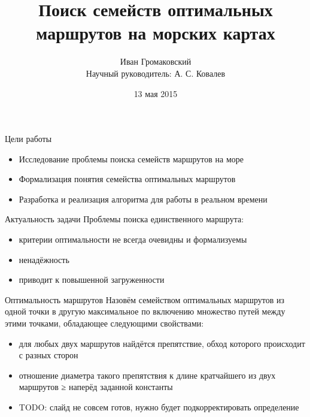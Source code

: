 \documentclass[mathserif]{beamer}
\title{Поиск семейств оптимальных маршрутов на морских картах}
\author{Иван Громаковский \\
Научный руководитель: А. С. Ковалев}
\institute{Санкт-Петербургский национальный исследовательский университет \\ информационных технологий, механики и оптики}
\date{13 мая 2015}
\begin{document}
\frame{\titlepage}

\begin{frame}{Цели работы}
    \begin{itemize}[<+->]
        \item Исследование проблемы поиска семейств маршрутов на море
        \item Формализация понятия семейства оптимальных маршрутов
        \item Разработка и реализация алгоритма для работы в реальном времени
    \end{itemize}
\end{frame}

\begin{frame}{Актуальность задачи}
    Проблемы поиска единственного маршрута:
    \begin{itemize}[<+->]
        \item критерии оптимальности не всегда очевидны и формализуемы
        \item ненадёжность
        \item приводит к повышенной загруженности
    \end{itemize}
\end{frame}
        
\begin{frame}{Оптимальность маршрутов}
    Назовём семейством оптимальных маршрутов из одной точки в другую 
    максимальное по включению множество путей между этими точками,
    обладающее следующими свойствами:
    \begin{itemize}[<+->]
        \item для любых двух маршрутов найдётся препятствие, обход
          которого происходит с разных сторон
        \item отношение диаметра такого препятствия к длине
          кратчайшего из двух маршрутов ≥ наперёд заданной константы
        \item TODO: слайд не совсем готов, нужно будет
          подкорректировать определение
    \end{itemize}
\end{frame}
\end{document}
